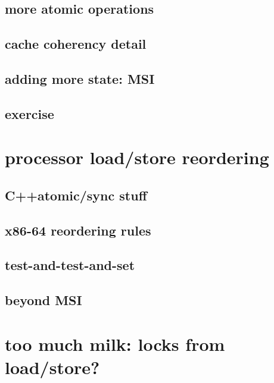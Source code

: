 \subsection{more atomic operations}



\subsection{cache coherency detail}
\subsection{adding more state: MSI}


\subsection{exercise}



\section{processor load/store reordering}


\subsection{C++atomic/sync stuff}


\subsection{x86-64 reordering rules}




\subsection{test-and-test-and-set}




\subsection{beyond MSI}

\section{too much milk: locks from load/store?}

